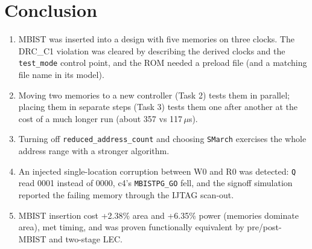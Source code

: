 \documentclass[11pt]{article}
\newcommand{\code}[1]{\texttt{\small #1}}
\begin{document}
\section{Conclusion}

\begin{enumerate}
  \item MBIST was inserted into a design with five memories on three clocks. The DRC\_C1 violation was cleared by describing the derived clocks and the \code{test\_mode} control point, and the ROM needed a preload file (and a matching file name in its model).
  \item Moving two memories to a new controller (Task 2) tests them in parallel; placing them in separate steps (Task 3) tests them one after another at the cost of a much longer run (about 357 vs 117\,$\mu$s).
  \item Turning off \code{reduced\_address\_count} and choosing \code{SMarch} exercises the whole address range with a stronger algorithm.
  \item An injected single-location corruption between W0 and R0 was detected: \code{Q} read 0001 instead of 0000, c4's \code{MBISTPG\_GO} fell, and the signoff simulation reported the failing memory through the IJTAG scan-out.
  \item MBIST insertion cost +2.38\% area and +6.35\% power (memories dominate area), met timing, and was proven functionally equivalent by pre/post-MBIST and two-stage LEC.
\end{enumerate}
\end{document}
